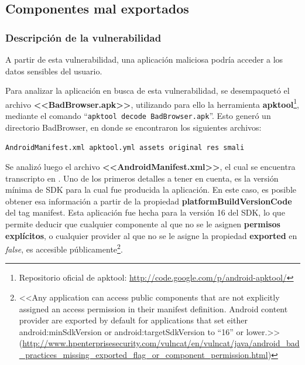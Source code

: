 \documentclass[11pt, a4paper, twoside]{article}
\begin{document}
\subsection{Componentes mal exportados}
\subsubsection{Descripción de la vulnerabilidad}
A partir de esta vulnerabilidad, una aplicación maliciosa podría 
acceder a los datos sensibles del usuario. 

Para analizar la aplicación en busca de esta vulnerabilidad, se desempaquetó el archivo \textbf{<<BadBrowser.apk>>}, utilizando para ello la herramienta \textbf{apktool}\footnote{Repositorio oficial de apktool: \url{http://code.google.com/p/android-apktool/}}, mediante el comando ``\texttt{apktool decode BadBrowser.apk}''. Esto generó un directorio BadBrowser, en donde se encontraron los siguientes archivos:
\begin{center}
\texttt{AndroidManifest.xml apktool.yml assets original res smali}
\end{center}

Se analizó luego el archivo \textbf{<<AndroidManifest.xml>>}, el cual se encuentra transcripto en . Uno de los primeros detalles a tener en cuenta, es la versión mínima de SDK para la cual fue producida la aplicación. En este caso, es posible obtener esa información a partir de la propiedad {\color{red}\textbf{platformBuildVersionCode}} del tag manifest. Esta aplicación fue hecha para la versión 16 del SDK, lo que permite deducir que cualquier componente al que no se le asignen \textbf{permisos explícitos}, o cualquier provider al que no se le asigne la propiedad \textbf{exported} en \emph{false}, es accesible públicamente\footnote{<<Any application can access public components that are not explicitly assigned an access permission in their manifest definition. Android content provider are exported by default for applications that set either android:minSdkVersion or android:targetSdkVersion to ``16'' or lower.>> (\url{http://www.hpenterprisesecurity.com/vulncat/en/vulncat/java/android_bad_practices_missing_exported_flag_or_component_permission.html})}.
\end{document}

